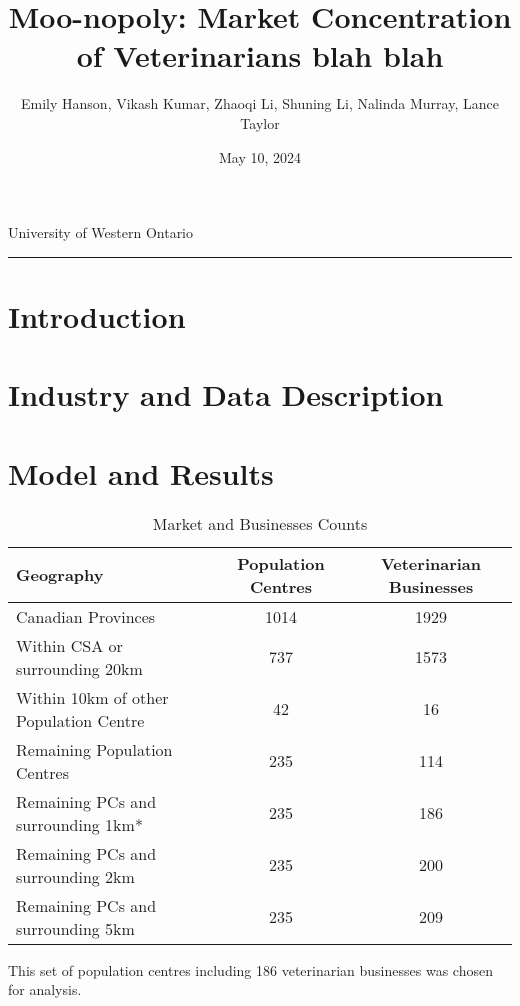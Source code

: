 \documentclass[a4paper,11pt]{article}
\title{\vspace{-1.2cm} Moo-nopoly: Market Concentration of Veterinarians blah blah}
\author{Emily Hanson, Vikash Kumar, Zhaoqi Li, Shuning Li, Nalinda Murray, Lance Taylor }
\date{May 10, 2024}
\begin{document}
\maketitle \vspace{-.4 in}
\begin{center}
University of Western Ontario
\rule{\textwidth}{1pt} 
\end{center}




\begin{abstract}
\lipsum[5]
\end{abstract}

\section{Introduction}

\section{Industry and Data Description}

\section{Model and Results}


\begin{table}[h]  
\begin{threeparttable}
\caption{Market and Businesses Counts} %
\centering %
\begin{tabular}{l c c } %
\hline\hline   
 Geography & Population Centres & Veterinarian Businesses   
\\ [0.5ex]  
\hline   
Canadian Provinces & 1014 & 1929 \\
Within CSA or surrounding 20km & 737 & 1573 \\
Within 10km of other Population Centre & 42 & 16 \\
Remaining Population Centres & 235 & 114 \\

Remaining PCs and surrounding 1km* & 235 & 186 \\

Remaining PCs and surrounding 2km  & 235 & 200 \\

Remaining PCs and surrounding 5km  & 235 & 209 \\

\hline %
\end{tabular}  
\begin{tablenotes}
    \small  *This set of population centres including 186 veterinarian businesses was chosen for analysis. 
\end{tablenotes}
\end{threeparttable}
\end{table}  
\end{document}
